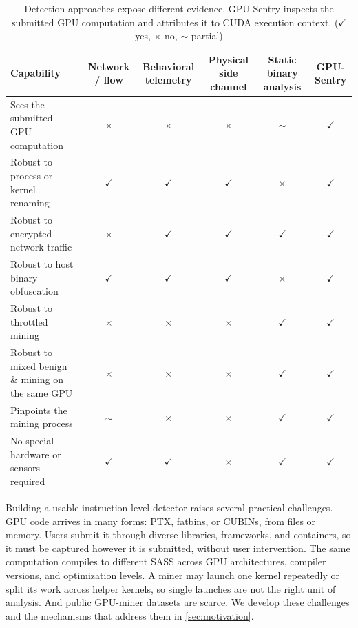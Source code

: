 \begin{table}[t]
    \centering
    \caption{Detection approaches expose different evidence. GPU-Sentry inspects the submitted GPU computation and attributes it to CUDA execution context. ($\checkmark$ yes, $\times$ no, $\sim$ partial)}
    \label{tab:feature_comparison}
    \footnotesize
    \begin{tabular}{lccccc}
        \toprule
        Capability & Network / flow & Behavioral telemetry & Physical side channel & Static binary analysis & \textbf{GPU-Sentry} \\
        \midrule
        Sees the submitted GPU computation & $\times$ & $\times$ & $\times$ & $\sim$ & \textbf{$\checkmark$} \\
        Robust to process or kernel renaming & $\checkmark$ & $\checkmark$ & $\checkmark$ & $\times$ & \textbf{$\checkmark$} \\
        Robust to encrypted network traffic & $\times$ & $\checkmark$ & $\checkmark$ & $\checkmark$ & \textbf{$\checkmark$} \\
        Robust to host binary obfuscation & $\checkmark$ & $\checkmark$ & $\checkmark$ & $\times$ & \textbf{$\checkmark$} \\
        Robust to throttled mining & $\times$ & $\times$ & $\times$ & $\checkmark$ & \textbf{$\checkmark$} \\
        Robust to mixed benign \& mining on the same GPU & $\times$ & $\times$ & $\times$ & $\checkmark$ & \textbf{$\checkmark$} \\
        Pinpoints the mining process & $\sim$ & $\times$ & $\times$ & $\checkmark$ & \textbf{$\checkmark$} \\
        No special hardware or sensors required & $\checkmark$ & $\checkmark$ & $\times$ & $\checkmark$ & \textbf{$\checkmark$} \\
        \bottomrule
    \end{tabular}
\end{table}

Building a usable instruction-level detector raises several practical challenges. GPU code arrives in many forms: PTX, fatbins, or CUBINs, from files or memory. Users submit it through diverse libraries, frameworks, and containers, so it must be captured however it is submitted, without user intervention. The same computation compiles to different SASS across GPU architectures, compiler versions, and optimization levels. A miner may launch one kernel repeatedly or split its work across helper kernels, so single launches are not the right unit of analysis. And public GPU-miner datasets are scarce. We develop these challenges and the mechanisms that address them in \cref{sec:motivation}.

